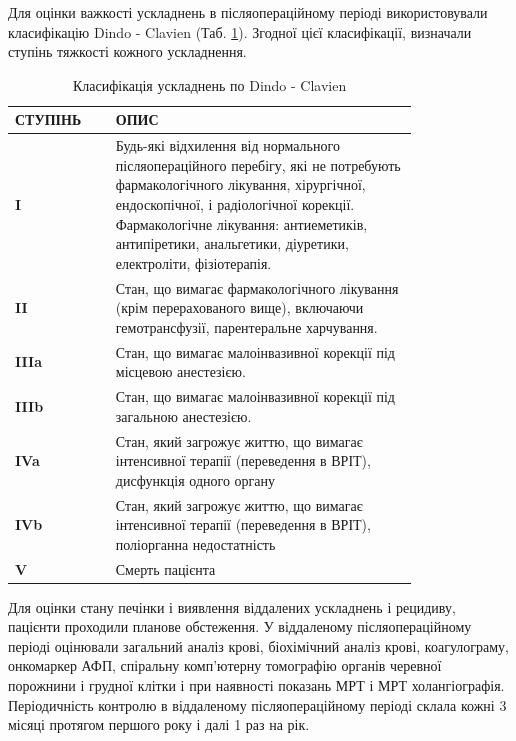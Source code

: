 Для оцінки важкості ускладнень в післяопераційному періоді використовували класифікацію Dindo - Clavien (Таб. \ref{tab:Dindo}). Згодної цієї класифікації, визначали ступінь тяжкості кожного ускладнення.


\begin{table}[]
\centering
\caption{Класифікація ускладнень по Dindo - Clavien}
\label{tab:Dindo}
\begin{tabular}{|p{0.2\linewidth}|p{0.6\linewidth}|}
\hline
{\color[HTML]{231F20} \textbf{СТУПІНЬ}} & {\color[HTML]{231F20} \textbf{ОПИС}}                                                                                        \\ \hline
\textbf{I} &
  Будь-які відхилення від нормального післяопераційного перебігу, які не потребують фармакологічного лікування, хірургічної, ендоскопічної, і радіологічної корекції. Фармакологічне лікування: антиеметиків, антипіретики, анальгетики, діуретики, електроліти, фізіотерапія. \\ \hline
\textbf{II}                             & Стан, що вимагає фармакологічного лікування (крім перерахованого вище), включаючи гемотрансфузії, парентеральне харчування. \\ \hline
\textbf{IIIa}                           & Стан, що вимагає малоінвазивної корекції під місцевою анестезією.                                                           \\ \hline
\textbf{IIIb}                           & Стан, що вимагає малоінвазивної корекції під загальною анестезією.                                                          \\ \hline
\textbf{IVa}                            & Стан, який загрожує життю, що вимагає інтенсивної терапії (переведення в ВРІТ), дисфункція одного органу                    \\ \hline
\textbf{IVb}                            & Стан, який загрожує життю, що вимагає інтенсивної терапії (переведення в ВРІТ), поліорганна недостатність                   \\ \hline
\textbf{V}                              & Смерть пацієнта                                                                                                             \\ \hline
\end{tabular}
\end{table}

Для оцінки стану печінки і виявлення віддалених ускладнень і рецидиву, пацієнти проходили планове обстеження. У віддаленому післяопераційному періоді оцінювали загальний аналіз крові, біохімічний аналіз крові, коагулограму, онкомаркер АФП, спіральну комп'ютерну томографію органів черевної порожнини і грудної клітки і при наявності показань МРТ і МРТ холангіографія. Періодичність контролю в віддаленому післяопераційному періоді склала кожні 3 місяці протягом першого року і далі 1 раз на рік.


